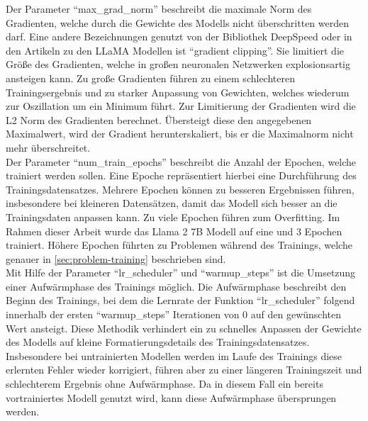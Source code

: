 Der Parameter \enquote{max\_grad\_norm} beschreibt die maximale Norm des Gradienten, welche durch die Gewichte des Modells nicht überschritten werden darf.
Eine andere Bezeichnungen genutzt von der Bibliothek DeepSpeed oder in den Artikeln zu den LLaMA Modellen ist \enquote{gradient clipping}.
Sie limitiert die Größe des Gradienten, welche in großen neuronalen Netzwerken explosionsartig ansteigen kann.
Zu große Gradienten führen zu einem schlechteren Trainingsergebnis und zu starker Anpassung von Gewichten, welches wiederum zur Oszillation um ein Minimum führt.
Zur Limitierung der Gradienten wird die L2 Norm des Gradienten berechnet.
Übersteigt diese den angegebenen Maximalwert, wird der Gradient herunterskaliert, bis er die Maximalnorm nicht mehr überschreitet.\\

Der Parameter \enquote{num\_train\_epochs} beschreibt die Anzahl der Epochen, welche trainiert werden sollen.
Eine Epoche repräsentiert hierbei eine Durchführung des Trainingsdatensatzes.
Mehrere Epochen können zu besseren Ergebnissen führen, insbesondere bei kleineren Datensätzen, damit das Modell sich besser an die Trainingsdaten anpassen kann.
Zu viele Epochen führen zum Overfitting.
Im Rahmen dieser Arbeit wurde das Llama 2 7B Modell auf eine und 3 Epochen trainiert.
Höhere Epochen führten zu Problemen während des Trainings, welche genauer in \cref{sec:problem-training} beschrieben sind.\\

Mit Hilfe der Parameter \enquote{lr\_scheduler} und \enquote{warmup\_steps} ist die Umsetzung einer Aufwärmphase des Trainings möglich.
Die Aufwärmphase beschreibt den Beginn des Trainings, bei dem die Lernrate der Funktion \enquote{lr\_scheduler} folgend innerhalb der ersten \enquote{warmup\_steps} Iterationen von 0 auf den gewünschten Wert ansteigt.
Diese Methodik verhindert ein zu schnelles Anpassen der Gewichte des Modells auf kleine Formatierungsdetails des Trainingsdatensatzes.
Insbesondere bei untrainierten Modellen werden im Laufe des Trainings diese erlernten Fehler wieder korrigiert, führen aber zu einer längeren Trainingszeit und schlechterem Ergebnis ohne Aufwärmphase.
Da in diesem Fall ein bereits vortrainiertes Modell genutzt wird, kann diese Aufwärmphase übersprungen werden.\\

